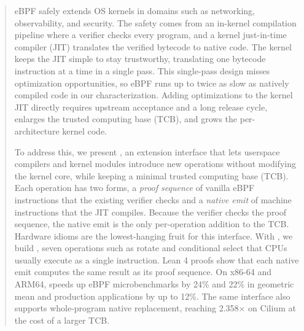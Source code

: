 \begin{abstract}
eBPF safely extends OS kernels in domains such as networking, observability, and security.
The safety comes from an in-kernel compilation pipeline where a verifier checks every program, and a kernel just-in-time compiler (JIT) translates the verified bytecode to native code.
The kernel keeps the JIT simple to stay trustworthy, translating one bytecode instruction at a time in a single pass.
This single-pass design misses optimization opportunities, so eBPF runs up to twice as slow as natively compiled code in our characterization.
Adding optimizations to the kernel JIT directly requires upstream acceptance and a long release cycle, enlarges the trusted computing base (TCB), and grows the per-architecture kernel code.

To address this, we present \tool, an extension interface that lets userspace compilers and kernel modules introduce new operations without modifying the kernel core, while keeping a minimal trusted computing base (TCB).
Each operation has two forms, a \emph{proof sequence} of vanilla eBPF instructions that the existing verifier checks and a \emph{native emit} of machine instructions that the JIT compiles.
Because the verifier checks the proof sequence, the native emit is the only per-operation addition to the TCB.
Hardware idioms are the lowest-hanging fruit for this interface. With \tool, we build \lang, seven operations such as rotate and conditional select that CPUs usually execute as a single instruction.
Lean 4 proofs show that each native emit computes the same result as its proof sequence.
On x86-64 and ARM64, \lang speeds up eBPF microbenchmarks by 24\% and 22\% in geometric mean and production applications by up to 12\%.
The same interface also supports whole-program native replacement, reaching 2.358$\times$ on Cilium at the cost of a larger TCB.
\end{abstract}